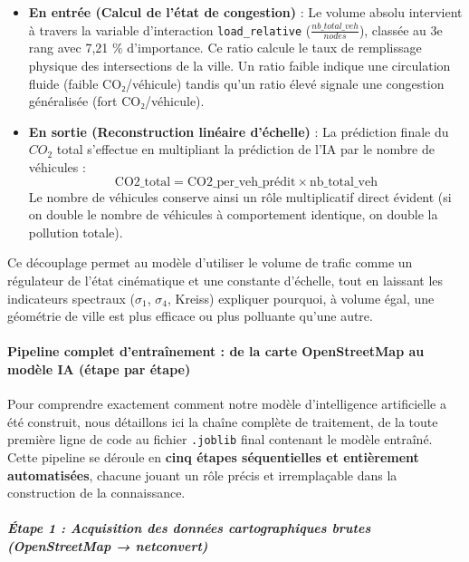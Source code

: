 \documentclass[10pt, a4paper]{article}
\providecommand{\tightlist}{}
\begin{document}
\begin{enumerate}
  \begin{itemize}
  \tightlist
  \item
    \textbf{En entrée (Calcul de l'état de congestion)} : Le volume
    absolu intervient à travers la variable d'interaction
    \texttt{load\_relative} (\(\frac{nb\_total\_veh}{nodes}\)), classée
    au 3e rang avec 7,21 \% d'importance. Ce ratio calcule le taux de
    remplissage physique des intersections de la ville. Un ratio faible
    indique une circulation fluide (faible CO₂/véhicule) tandis qu'un
    ratio élevé signale une congestion généralisée (fort CO₂/véhicule).
  \item
    \textbf{En sortie (Reconstruction linéaire d'échelle)} : La
    prédiction finale du \(CO_2\) total s'effectue en multipliant la
    prédiction de l'IA par le nombre de véhicules :
    \[\text{CO2\_total} = \text{CO2\_per\_veh\_prédit} \times \text{nb\_total\_veh}\]
    Le nombre de véhicules conserve ainsi un rôle multiplicatif direct
    évident (si on double le nombre de véhicules à comportement
    identique, on double la pollution totale).
  \end{itemize}
\end{enumerate}

Ce découplage permet au modèle d'utiliser le volume de trafic comme un
régulateur de l'état cinématique et une constante d'échelle, tout en
laissant les indicateurs spectraux (\(\sigma_1\), \(\sigma_4\), Kreiss)
expliquer pourquoi, à volume égal, une géométrie de ville est plus
efficace ou plus polluante qu'une autre.

\paragraph{Pipeline complet d'entraînement : de la carte OpenStreetMap
au modèle IA (étape par
étape)}\label{pipeline-complet-dentrauxeenement-de-la-carte-openstreetmap-au-moduxe8le-ia-uxe9tape-par-uxe9tape}

Pour comprendre exactement comment notre modèle d'intelligence
artificielle a été construit, nous détaillons ici la chaîne complète de
traitement, de la toute première ligne de code au fichier
\texttt{.joblib} final contenant le modèle entraîné. Cette pipeline se
déroule en \textbf{cinq étapes séquentielles et entièrement
automatisées}, chacune jouant un rôle précis et irremplaçable dans la
construction de la connaissance.

\subparagraph{Étape 1 : Acquisition des données cartographiques brutes
(OpenStreetMap →
netconvert)}\label{uxe9tape-1-acquisition-des-donnuxe9es-cartographiques-brutes-openstreetmap-netconvert}
\end{document}
